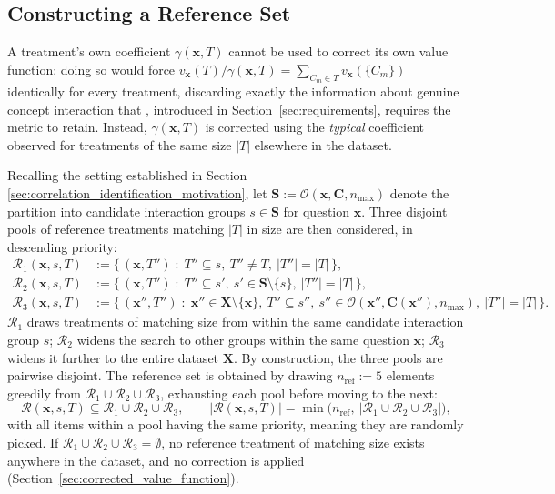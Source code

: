 \subsection{Constructing a Reference Set}
\label{sec:reference_set}

A treatment's own coefficient $\gamma(\mathbf{x},T)$ cannot be used to correct its own value function: doing so would force $v_{\mathbf{x}}(T)/\gamma(\mathbf{x},T) = \sum_{C_m\in T} v_{\mathbf{x}}(\{C_m\})$ identically for every treatment, discarding exactly the information about genuine concept interaction that , introduced in Section~\ref{sec:requirements}, requires the metric to retain. Instead, $\gamma(\mathbf{x},T)$ is corrected using the \emph{typical} coefficient observed for treatments of the same size $|T|$ elsewhere in the dataset.

Recalling the setting established in Section \ref{sec:correlation_identification_motivation}, let $\mathbf{S} := \mathcal{O}(\mathbf{x}, \mathbf{C}, n_{\max})$ denote the partition into candidate interaction groups $s \in \mathbf{S}$ for question $\mathbf{x}$. Three disjoint pools of reference treatments matching $|T|$ in size are then considered, in descending priority:
\begin{align}
	\mathcal{R}_1(\mathbf{x},s,T) & := \big\{\, (\mathbf{x},T'') \;:\; T''\subseteq s,\ T''\neq T,\ |T''|=|T| \,\big\}, \label{eq:R_1}
	\\
	\mathcal{R}_2(\mathbf{x},s,T) & := \big\{\, (\mathbf{x},T'') \;:\; T''\subseteq s',\ s'\in \mathbf{S}\setminus\{s\},\ |T''|=|T| \,\big\}, \label{eq:R_2}
	\\
	\mathcal{R}_3(\mathbf{x},s,T) & := \big\{\, (\mathbf{x}'',T'') \;:\; \mathbf{x}''\in \mathbf{X}\setminus\{\mathbf{x}\},\ T''\subseteq s'',\ s''\in \mathcal{O}(\mathbf{x}'',\mathbf{C}(\mathbf{x}''),n_{\max}),\ |T''|=|T| \,\big\}. \label{eq:R_3}
\end{align}
$\mathcal{R}_1$ draws treatments of matching size from within the same candidate interaction group $s$; $\mathcal{R}_2$ widens the search to other groups within the same question $\mathbf{x}$; $\mathcal{R}_3$ widens it further to the entire dataset $\mathbf{X}$. By construction, the three pools are pairwise disjoint. The reference set is obtained by drawing $n_{\mathrm{ref}} := 5$ elements greedily from $\mathcal{R}_1 \cup \mathcal{R}_2 \cup \mathcal{R}_3$, exhausting each pool before moving to the next:
\begin{equation}
	\label{eq:reference_set}
	\mathcal{R}(\mathbf{x},s,T) \subseteq \mathcal{R}_1\cup\mathcal{R}_2\cup\mathcal{R}_3, \qquad |\mathcal{R}(\mathbf{x},s,T)| = \min\big(n_{\mathrm{ref}},\ |\mathcal{R}_1\cup\mathcal{R}_2\cup\mathcal{R}_3|\big),
\end{equation}
with all items within a pool having the same priority, meaning they are randomly picked. If $\mathcal{R}_1\cup\mathcal{R}_2\cup\mathcal{R}_3=\emptyset$, no reference treatment of matching size exists anywhere in the dataset, and no correction is applied (Section~\ref{sec:corrected_value_function}).

